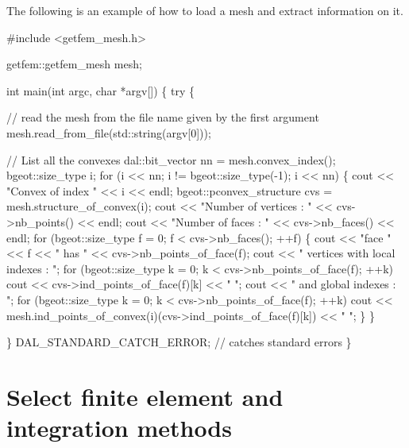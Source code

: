 \documentclass[11pt,a4paper]{article}
\begin{document}
The following is an example of how to load a mesh and extract information on it.
\begin{cppcode}
  \#include <getfem\_mesh.h>
  
  getfem::getfem\_mesh mesh; 
  
  int main(int argc, char *argv[]) \{ 
    try \{ 
     
      // read the mesh from the file name given by the first argument 
      mesh.read\_from\_file(std::string(argv[0])); 
     
      // List all the convexes
      dal::bit\_vector nn = mesh.convex\_index(); 
      bgeot::size\_type i; 
      for (i << nn; i != bgeot::size\_type(-1); i << nn) \{
        cout << "Convex of index " << i << endl; 
        bgeot::pconvex\_structure cvs =  mesh.structure\_of\_convex(i); 
        cout << "Number of vertices : " << cvs->nb\_points() << endl; 
        cout << "Number of faces : " << cvs->nb\_faces() << endl;
        for (bgeot::size\_type f = 0; f < cvs->nb\_faces(); ++f) \{
          cout << "face " << f << " has " << cvs->nb\_points\_of\_face(f); 
          cout << " vertices with local indexes : "; 
          for (bgeot::size\_type k = 0; k < cvs->nb\_points\_of\_face(f); ++k) 
          cout << cvs->ind\_points\_of\_face(f)[k] << " "; 
          cout << " and global indexes : ";
          for (bgeot::size\_type k = 0; k < cvs->nb\_points\_of\_face(f); ++k) 
            cout << mesh.ind\_points\_of\_convex(i)(cvs->ind\_points\_of\_face(f)[k]) << " ";
        \}
     \}
     
   \} DAL\_STANDARD\_CATCH\_ERROR; // catches standard errors
 \}
\end{cppcode}

\section{Select finite element and integration methods}
\end{document}
